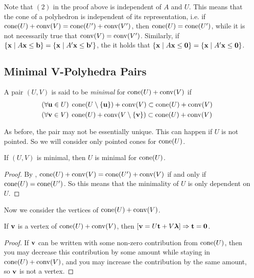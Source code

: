 \begin{Remark}\label{re_characteristic_cone}  Note that $(2)$ in the proof above is independent of $A$ and $U$.  This means that the cone of a polyhedron is independent of its representation, i.e. if $\operatorname{cone}(U) + \operatorname{conv}(V) = \operatorname{cone}(U') + \operatorname{conv}(V')$, then $\operatorname{cone}(U) = \operatorname{cone}(U')$, while it is not necessarily true that $\operatorname{conv}(V) = \operatorname{conv}(V')$.  Similarly, if $\left\{\mathbf{x}\;|\; A\mathbf{x}\leq \mathbf{b}\right\} = \left\{\mathbf{x}\;|\; A'\mathbf{x}\leq \mathbf{b}'\right\}$, the it holds that $\left\{\mathbf{x}\;|\; A\mathbf{x}\leq\mathbf{0}\right\} = \left\{\mathbf{x}\;|\; A'\mathbf{x}\leq\mathbf{0}\right\}$.
\end{Remark}

\subsection{Minimal V-Polyhedra Pairs}

\begin{Def}
	A pair $(U,V)$ is said to be \textit{minimal} for $\operatorname{cone}(U) + \operatorname{conv}(V)$ if
	\begin{align}
		 & (\forall \mathbf{u}\in U)\;\operatorname{cone}(U\setminus\left\{\mathbf{u}\right\}) + \operatorname{conv}(V) \subset \operatorname{cone}(U) + \operatorname{conv}(V) \\
		 & (\forall \mathbf{v}\in V)\;\operatorname{cone}(U) + \operatorname{conv}(V\setminus\left\{\mathbf{v}\right\}) \subset \operatorname{cone}(U) + \operatorname{conv}(V)
	\end{align}
\end{Def}

As before, the pair may not be essentially unique.  This can happen if $U$ is not pointed.  So we will consider only pointed cones for $\operatorname{cone}(U)$.

\begin{Prop}\label{u_min}
	If $(U,V)$ is minimal, then $U$ is minimal for $\operatorname{cone}(U)$.
\end{Prop}

\begin{proof}
	By , $\operatorname{cone}(U) + \operatorname{conv}(V) = \operatorname{cone}(U') + \operatorname{conv}(V)$ if and only if $\operatorname{cone}(U) = \operatorname{cone}(U')$.  So this means that the minimality of $U$ is only dependent on $U$.
\end{proof}

Now we consider the vertices of $\operatorname{cone}(U) + \operatorname{conv}(V)$.

\begin{Prop}\label{v_t_must_be_z}
	If $\mathbf{v}$ is a vertex of $\operatorname{cone}(U) + \operatorname{conv}(V)$, then $[\mathbf{v} = U\mathbf{t} + V\bm{\lambda}] \Rightarrow \mathbf{t} = \mathbf{0}$.
\end{Prop}

\begin{proof}
	If $\mathbf{v}$ can be written with some non-zero contribution from $\operatorname{cone}(U)$, then you may decrease this contribution by some amount while staying in $\operatorname{cone}(U) + \operatorname{conv}(V)$, and you may increase the contribution by the same amount, so $\mathbf{v}$ is not a vertex.
\end{proof}


